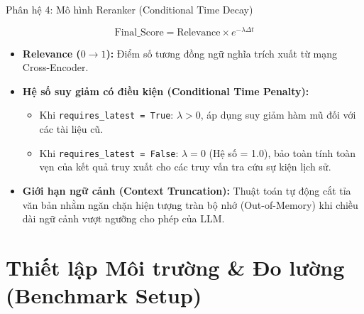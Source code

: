 \documentclass[aspectratio=169, xcolor=table]{beamer}
\begin{document}
\begin{frame}{Phân hệ 4: Mô hình Reranker (Conditional Time Decay)}
    \begin{alertbox}
        \vspace{-0.2cm}
        \begin{equation}
            \text{Final\_Score} = \text{Relevance} \times e^{-\lambda \Delta t}
        \end{equation}
    \end{alertbox}
    
    \vspace{0.2cm}
    
    \begin{itemize}
        \small
        \item \textbf{Relevance ($0 \to 1$):} Điểm số tương đồng ngữ nghĩa trích xuất từ mạng Cross-Encoder.
        \item \textbf{Hệ số suy giảm có điều kiện (Conditional Time Penalty):} 
        \begin{itemize}
            \footnotesize
            \item Khi \texttt{requires\_latest = True}: $\lambda > 0$, áp dụng suy giảm hàm mũ đối với các tài liệu cũ.
            \item Khi \texttt{requires\_latest = False}: $\lambda = 0$ (Hệ số = 1.0), bảo toàn tính toàn vẹn của kết quả truy xuất cho các truy vấn tra cứu sự kiện lịch sử.
        \end{itemize}
        \item \textbf{Giới hạn ngữ cảnh (Context Truncation):} Thuật toán tự động cắt tỉa văn bản nhằm ngăn chặn hiện tượng tràn bộ nhớ (Out-of-Memory) khi chiều dài ngữ cảnh vượt ngưỡng cho phép của LLM.
    \end{itemize}
\end{frame}


\section{Thiết lập Môi trường \& Đo lường (Benchmark Setup)}
\end{document}
